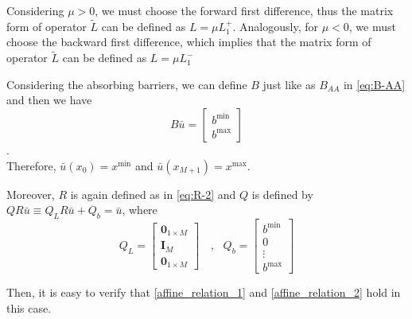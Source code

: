 \documentclass[11pt]{article}
\begin{document}
Considering $\mu>0$, we must choose the forward first difference, thus the matrix form of operator $\tilde{L}$ can be defined as $L = \mu L_1^+$. Analogously, for $\mu<0$, we must choose the backward first difference, which implies that the matrix form of operator $\tilde{L}$ can be defined as $L = \mu L_1^-$%

Considering the absorbing barriers, we can define $B$ just like as $B_{AA}$ in \cref{eq:B-AA} and then we have
\begin{equation}
B\bar{u} = \begin{bmatrix}
b^{\min}\\
b^{\max}
\end{bmatrix}
\end{equation}.\\
Therefore, $\bar{u}(x_0) = x^{\min}$ and $\bar{u}(x_{M+1}) = x^{\max}$.

Moreover, $R$ is again defined as in \cref{eq:R-2} and $Q$ is defined by $Q R\bar{u}\equiv Q_L R\bar{u}+Q_b = \bar{u}$, where
\begin{equation}
Q_L = \begin{bmatrix}
\mathbf{0}_{1\times M} \\
\mathbf{I}_M  \\
\mathbf{0}_{1\times M}
\end{bmatrix}%
\quad, \text{ } Q_b = \begin{bmatrix}
b^{\min}\\
0\\
\vdots\\
b^{\max}
\end{bmatrix}%
\end{equation}

Then, it is easy to verify that \cref{affine_relation_1} and \cref{affine_relation_2} hold in this case.


\end{document}
